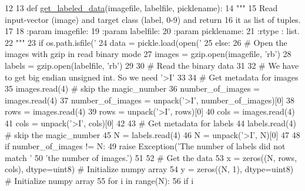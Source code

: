 \begin{DoxyCode}
12 
13 \textcolor{keyword}{def }\hyperlink{namespacelearning_a97ec8093e520fef4cdd5dcf7782e0ac5}{get\_labeled\_data}(imagefile, labelfile, picklename):
14     \textcolor{stringliteral}{"""}
15 \textcolor{stringliteral}{    Read input-vector (image) and target class (label, 0-9) and return}
16 \textcolor{stringliteral}{    it as list of tuples.}
17 \textcolor{stringliteral}{}
18 \textcolor{stringliteral}{    :param imagefile:}
19 \textcolor{stringliteral}{    :param labelfile:}
20 \textcolor{stringliteral}{    :param picklename:}
21 \textcolor{stringliteral}{    :rtype : list.}
22 \textcolor{stringliteral}{    """}
23     \textcolor{keywordflow}{if} os.path.isfile(\textcolor{stringliteral}{'%
24         data = pickle.load(open(\textcolor{stringliteral}{'%
25     \textcolor{keywordflow}{else}:
26         \textcolor{comment}{# Open the images with gzip in read binary mode}
27         images = gzip.open(imagefile, \textcolor{stringliteral}{'rb'})
28         labels = gzip.open(labelfile, \textcolor{stringliteral}{'rb'})
29 
30         \textcolor{comment}{# Read the binary data}
31 
32         \textcolor{comment}{# We have to get big endian unsigned int. So we need '>I'}
33 
34         \textcolor{comment}{# Get metadata for images}
35         images.read(4)  \textcolor{comment}{# skip the magic\_number}
36         number\_of\_images = images.read(4)
37         number\_of\_images = unpack(\textcolor{stringliteral}{'>I'}, number\_of\_images)[0]
38         rows = images.read(4)
39         rows = unpack(\textcolor{stringliteral}{'>I'}, rows)[0]
40         cols = images.read(4)
41         cols = unpack(\textcolor{stringliteral}{'>I'}, cols)[0]
42 
43         \textcolor{comment}{# Get metadata for labels}
44         labels.read(4)  \textcolor{comment}{# skip the magic\_number}
45         N = labels.read(4)
46         N = unpack(\textcolor{stringliteral}{'>I'}, N)[0]
47 
48         \textcolor{keywordflow}{if} number\_of\_images != N:
49             \textcolor{keywordflow}{raise} Exception(\textcolor{stringliteral}{'The number of labels did not match '}
50                             \textcolor{stringliteral}{'the number of images.'})
51 
52         \textcolor{comment}{# Get the data}
53         x = zeros((N, rows, cols), dtype=uint8)  \textcolor{comment}{# Initialize numpy array}
54         y = zeros((N, 1), dtype=uint8)  \textcolor{comment}{# Initialize numpy array}
55         \textcolor{keywordflow}{for} i \textcolor{keywordflow}{in} range(N):
56             \textcolor{keywordflow}{if} i %
}}
\end{DoxyCode}
